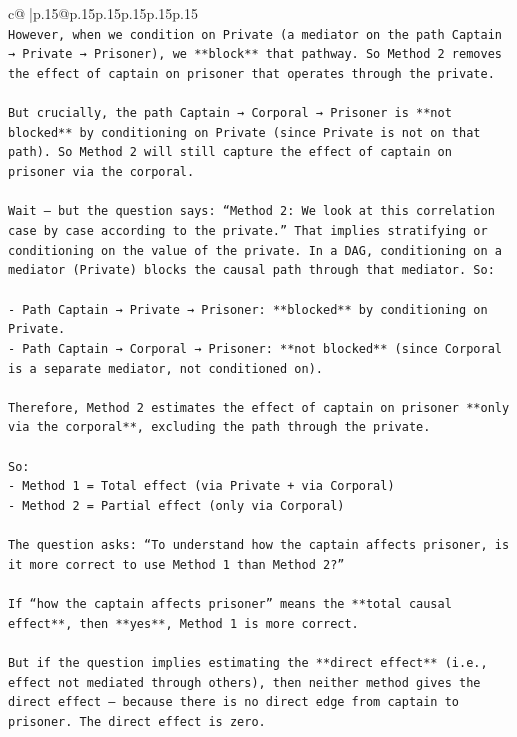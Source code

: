 \documentclass{article}
\begin{document}
{\begin{supertabular}{c@{$\;$}|p{.15\linewidth}@{}p{.15\linewidth}p{.15\linewidth}p{.15\linewidth}p{.15\linewidth}p{.15\linewidth}}
{{{\\ 
\texttt{However, when we condition on Private (a mediator on the path Captain → Private → Prisoner), we **block** that pathway. So Method 2 removes the effect of captain on prisoner that operates through the private.} \\
\\ 
\texttt{But crucially, the path Captain → Corporal → Prisoner is **not blocked** by conditioning on Private (since Private is not on that path). So Method 2 will still capture the effect of captain on prisoner via the corporal.} \\
\\ 
\texttt{Wait — but the question says: “Method 2: We look at this correlation case by case according to the private.” That implies stratifying or conditioning on the value of the private. In a DAG, conditioning on a mediator (Private) blocks the causal path through that mediator. So:} \\
\\ 
\texttt{{-} Path Captain → Private → Prisoner: **blocked** by conditioning on Private.} \\
\texttt{{-} Path Captain → Corporal → Prisoner: **not blocked** (since Corporal is a separate mediator, not conditioned on).} \\
\\ 
\texttt{Therefore, Method 2 estimates the effect of captain on prisoner **only via the corporal**, excluding the path through the private.} \\
\\ 
\texttt{So:} \\
\texttt{{-} Method 1 = Total effect (via Private + via Corporal)} \\
\texttt{{-} Method 2 = Partial effect (only via Corporal)} \\
\\ 
\texttt{The question asks: “To understand how the captain affects prisoner, is it more correct to use Method 1 than Method 2?”} \\
\\ 
\texttt{If “how the captain affects prisoner” means the **total causal effect**, then **yes**, Method 1 is more correct.} \\
\\ 
\texttt{But if the question implies estimating the **direct effect** (i.e., effect not mediated through others), then neither method gives the direct effect — because there is no direct edge from captain to prisoner. The direct effect is zero.} \\
}}}
\end{supertabular}}
\end{document}
